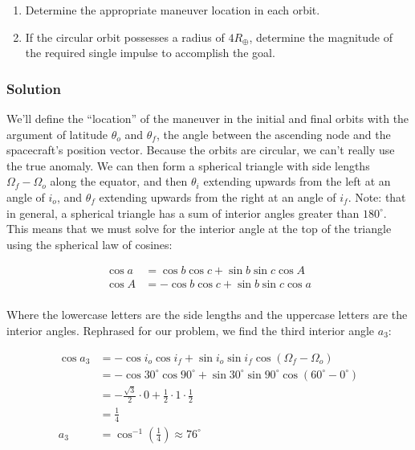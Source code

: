 \begin{enumerate}
    \item Determine the appropriate maneuver location in each orbit.
    \item If the circular orbit possesses a radius of $4R_\oplus$, determine the magnitude of the required single impulse to accomplish the goal.
\end{enumerate}

\subsubsection{Solution}

We'll define the ``location'' of the maneuver in the initial and final orbits with the argument of latitude $\theta_o$ and $\theta_f$, the angle between the ascending node and the spacecraft's position vector. Because the orbits are circular, we can't really use the true anomaly. We can then form a spherical triangle with side lengths $\Omega_f - \Omega_o$ along the equator, and then $\theta_i$ extending upwards from the left at an angle of $i_o$, and $\theta_f$ extending upwards from the right at an angle of $i_f$. Note: that in general, a spherical triangle has a sum of interior angles greater than $180^\circ$. This means that we must solve for the interior angle at the top of the triangle using the spherical law of cosines:

\begin{align*}
    \cos a &= \cos b \cos c + \sin b \sin c \cos A \\
    \cos A &= - \cos b \cos c + \sin b \sin c \cos a \\
\end{align*}

Where the lowercase letters are the side lengths and the uppercase letters are the interior angles. Rephrased for our problem, we find the third interior angle $a_3$:

\begin{align*}
    \cos a_3 &= - \cos i_o \cos i_f + \sin i_o \sin i_f \cos(\Omega_f - \Omega_o) \\
    &= - \cos 30^\circ \cos 90^\circ + \sin 30^\circ \sin 90^\circ \cos(60^\circ - 0^\circ) \\
    &= - \frac{\sqrt{3}}{2} \cdot 0 + \frac{1}{2} \cdot 1 \cdot \frac{1}{2} \\
    &= \frac{1}{4} \\
    a_3 &= \cos^{-1} \left( \frac{1}{4} \right) \approx 76^\circ \\
\end{align*}


